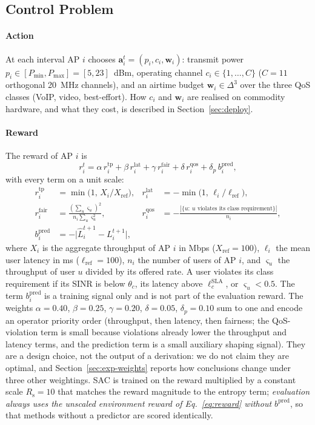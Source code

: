 \subsection{Control Problem}
\label{sec:action}

\paragraph{Action} At each interval AP $i$ chooses $\mathbf{a}_i^t=(p_i,c_i,\mathbf{w}_i)$: transmit power $p_i\in[P_{\min},P_{\max}]=[5,23]$~dBm, operating channel $c_i\in\{1,\dots,C\}$ ($C=11$ orthogonal 20~MHz channels), and an airtime budget $\mathbf{w}_i\in\Delta^3$ over the three QoS classes (VoIP, video, best-effort). How $c_i$ and $\mathbf{w}_i$ are realised on commodity hardware, and what they cost, is described in Section~\ref{sec:deploy}.

\paragraph{Reward} The reward of AP $i$ is
\begin{equation}
  r_i^t=\alpha\, r^{\mathrm{tp}}_i+\beta\, r^{\mathrm{lat}}_i+\gamma\, r^{\mathrm{fair}}_i+\delta\, r^{\mathrm{qos}}_i+\delta_p\, b^{\mathrm{pred}}_i,
  \label{eq:reward}
\end{equation}
with every term on a unit scale:
\begin{align*}
  r^{\mathrm{tp}}_i&=\min\!\big(1,\,X_i/X_{\mathrm{ref}}\big), &
  r^{\mathrm{lat}}_i&=-\min\!\big(1,\,\ell_i/\ell_{\mathrm{ref}}\big),\\
  r^{\mathrm{fair}}_i&=\frac{(\sum_{u}\varsigma_u)^2}{n_i\sum_u\varsigma_u^2}, &
  r^{\mathrm{qos}}_i&=-\frac{|\{u:\ u\text{ violates its class requirement}\}|}{n_i},\\
  b^{\mathrm{pred}}_i&=-\big|\hat L_i^{t+1}-L_i^{t+1}\big|, & &
\end{align*}
where $X_i$ is the aggregate throughput of AP $i$ in Mbps ($X_{\mathrm{ref}}=100$), $\ell_i$ the mean user latency in ms ($\ell_{\mathrm{ref}}=100$), $n_i$ the number of users of AP $i$, and $\varsigma_u$ the throughput of user $u$ divided by its offered rate. A user violates its class requirement if its SINR is below $\theta_c$, its latency above $\ell^{\mathrm{SLA}}_c$, or $\varsigma_u<0.5$. The term $b^{\mathrm{pred}}_i$ is a training signal only and is not part of the evaluation reward.
The weights $\alpha=0.40$, $\beta=0.25$, $\gamma=0.20$, $\delta=0.05$, $\delta_p=0.10$ sum to one and encode an operator priority order (throughput, then latency, then fairness; the QoS-violation term is small because violations already lower the throughput and latency terms, and the prediction term is a small auxiliary shaping signal). They are a design choice, not the output of a derivation: we do not claim they are optimal, and Section~\ref{sec:exp-weights} reports how conclusions change under three other weightings. SAC is trained on the reward multiplied by a constant scale $R_{\mathrm{s}}=10$ that matches the reward magnitude to the entropy term; \emph{evaluation always uses the unscaled environment reward of Eq.~\eqref{eq:reward} without $b^{\mathrm{pred}}$}, so that methods without a predictor are scored identically.

